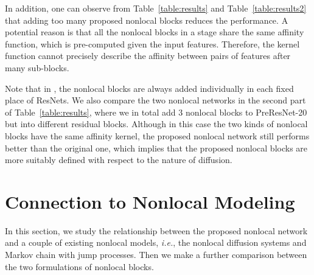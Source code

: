 \documentclass{article}
\begin{document}
In addition, one can observe from Table~\ref{table:results} and Table~\ref{table:results2} that adding too many proposed nonlocal blocks reduces the performance. A potential reason is that all the nonlocal blocks in a stage share the same affinity function, which is pre-computed given the input features. Therefore, the kernel function cannot precisely describe the affinity between pairs of features after many sub-blocks. 

Note that in \cite{wang2017non}, the nonlocal blocks are always added individually in each fixed place of ResNets. We also compare the two nonlocal networks in the second part of Table~\ref{table:results}, where we in total add 3 nonlocal blocks to PreResNet-20 but into different residual blocks. Although in this case the two kinds of nonlocal blocks have the  same affinity kernel, the proposed nonlocal network still performs better than the original one, which implies that the proposed nonlocal blocks are more suitably defined with respect to the nature of diffusion.


\section{Connection to Nonlocal Modeling}\label{sec:relation}
In this section, we study the relationship between the proposed nonlocal network and a couple of existing nonlocal models, {\em i.e.}, the nonlocal diffusion systems and Markov chain with jump processes. Then we make a further comparison between the two formulations of nonlocal blocks.
\end{document}
